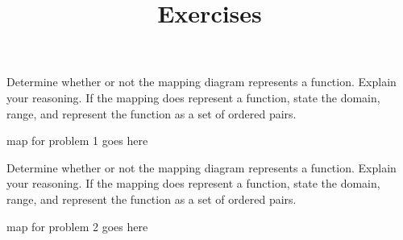 \documentclass{ximera}
\title{Exercises} \license{CC BY-NC-SA 4.0}
\begin{document}
\begin{abstract}
\end{abstract}
\maketitle





\begin{problem}\label{mappingfirst}
Determine whether or not the mapping diagram represents a function. Explain your reasoning. If the mapping does represent a function, state the domain, range, and represent the function as a set of ordered pairs.

map for problem 1 goes here
\end{problem} 






\begin{problem}\label{mappinglast}
Determine whether or not the mapping diagram represents a function. Explain your reasoning. If the mapping does represent a function, state the domain, range, and represent the function as a set of ordered pairs.

    map for problem 2 goes here
\end{problem} 



\end{document}

